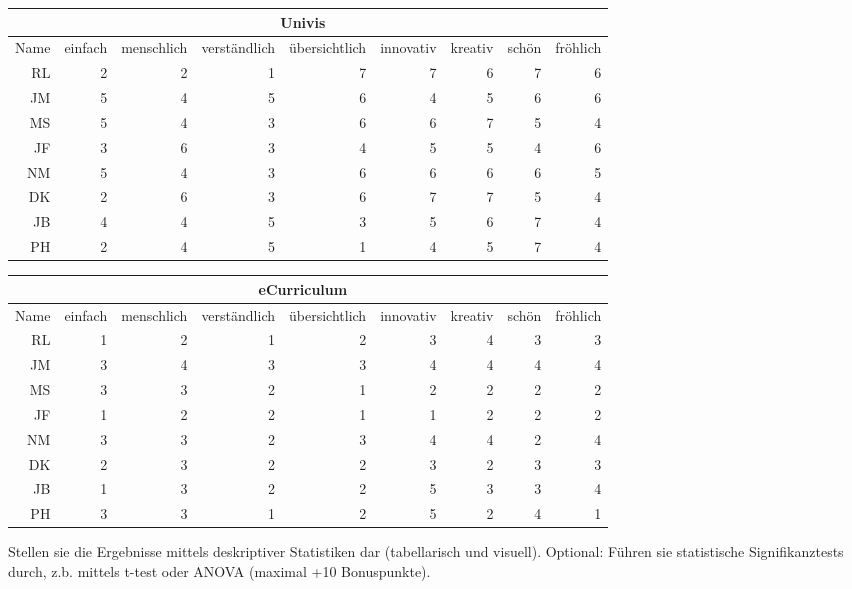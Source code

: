 \documentclass[a4paper,10pt]{scrartcl}
\begin{document}
\begin{center}
\begin{tabular}{r|r|r|r|r|r|r|r|r}
     & \multicolumn{7}{c}{Univis} \\ \hline
    Name & einfach & menschlich & verständlich & übersichtlich & innovativ & kreativ & schön & fröhlich \\ \hline
    RL & 2 & 2 & 1 & 7 & 7 & 6 & 7 & 6 \\ \hline
    JM & 5 & 4 & 5 & 6 & 4 & 5 & 6 & 6 \\ \hline
    MS & 5 & 4 & 3 & 6 & 6 & 7 & 5 & 4 \\ \hline
    JF & 3 & 6 & 3 & 4 & 5 & 5 & 4 & 6 \\ \hline
    NM & 5 & 4 & 3 & 6 & 6 & 6 & 6 & 5 \\ \hline
    DK & 2 & 6 & 3 & 6 & 7 & 7 & 5 & 4 \\ \hline
    JB & 4 & 4 & 5 & 3 & 5 & 6 & 7 & 4 \\ \hline
    PH & 2 & 4 & 5 & 1 & 4 & 5 & 7 & 4 \\
\end{tabular}
\end{center}

\begin{center}
\begin{tabular}{r|r|r|r|r|r|r|r|r}
     & \multicolumn{7}{c}{eCurriculum} \\ \hline
    Name & einfach & menschlich & verständlich & übersichtlich & innovativ & kreativ & schön & fröhlich \\ \hline
    RL & 1 & 2 & 1 & 2 & 3 & 4 & 3 & 3 \\ \hline
    JM & 3 & 4 & 3 & 3 & 4 & 4 & 4 & 4 \\ \hline
    MS & 3 & 3 & 2 & 1 & 2 & 2 & 2 & 2 \\ \hline
    JF & 1 & 2 & 2 & 1 & 1 & 2 & 2 & 2 \\ \hline
    NM & 3 & 3 & 2 & 3 & 4 & 4 & 2 & 4 \\ \hline
    DK & 2 & 3 & 2 & 2 & 3 & 2 & 3 & 3 \\ \hline
    JB & 1 & 3 & 2 & 2 & 5 & 3 & 3 & 4 \\ \hline
    PH & 3 & 3 & 1 & 2 & 5 & 2 & 4 & 1 \\
\end{tabular}
\end{center}

Stellen sie die Ergebnisse mittels deskriptiver Statistiken dar (tabellarisch und visuell). 
Optional: Führen sie statistische Signifikanztests durch, z.b. mittels t-test oder ANOVA (maximal +10 Bonuspunkte). 
\end{document}
